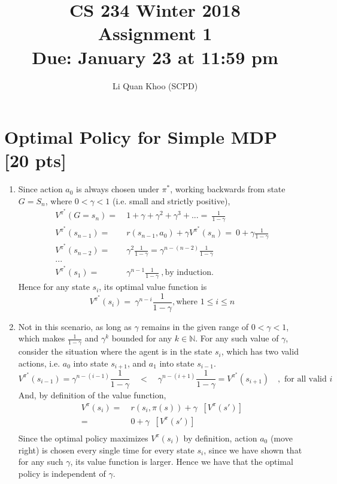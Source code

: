 \documentclass[11pt]{article}
\title{CS 234 Winter 2018 \\ Assignment 1 \\ Due: January 23 at 11:59 pm}
\author{ Li Quan Khoo (SCPD) }
\date{}
\newcommand{\Ex}{\mathbb E}
\newcommand{\Vfunc}[2]{\ensuremath{V^{#1}(#2)}}
\begin{document}
	\maketitle

\section{Optimal Policy for Simple MDP [20 pts]}

\begin{enumerate}[label=(\alph*)]
	
	\item Since action $a_0$ is always chosen under $\pi^*$, working backwards from state $G=S_n$, where $0 < \gamma < 1$ (i.e. small and strictly positive),
	\begin{align*}
	\Vfunc{\pi^*}{G=s_n}   =&\ 1+\gamma+\gamma^2+\gamma^3+... =\ \frac{1}{1-\gamma} \\ 
	\Vfunc{\pi^*}{s_{n-1}} =&\ r(s_{n-1}, a_0) + \gamma \Vfunc{\pi^*}{s_n} =\ 0 + \gamma \frac{1}{1-\gamma} \\ 
	\Vfunc{\pi^*}{s_{n-2}} =&\ \gamma^2 \frac{1}{1-\gamma} = \gamma^{n-(n-2)} \frac{1}{1-\gamma} \\ 
	... \\ 
	\Vfunc{\pi^*}{s_1}   =&\ \gamma^{n-1} \frac{1}{1-\gamma} \ ,\textrm{by induction.}
	\end{align*}
	Hence for any state $s_i$, its optimal value function is
	$$\Vfunc{\pi^*}{s_i}   =\ \gamma^{n-i} \frac{1}{1-\gamma}, \textrm{where } 1 \leq i \leq n$$

	
	\item Not in this scenario, as long as $\gamma$ remains in the given range of $0 < \gamma < 1$, which makes $\frac{1}{1-\gamma}$ and $\gamma^k$ bounded for any $k\in\mathbb{N}$. For any such value of $\gamma$, consider the situation where the agent is in the state $s_i$, which has two valid actions, i.e. $a_0$ into state $s_{i+1}$, and $a_1$ into state $s_{i-1}$.
	$$ \Vfunc{\pi^*}{s_{i-1}} = \gamma^{n-(i-1)}\frac{1}{1-\gamma} \quad <
	\quad \gamma^{n-(i+1)}\frac{1}{1-\gamma} = \Vfunc{\pi^*}{s_{i+1}} \quad , \textrm{ for all valid } i$$
	And, by definition of the value function,
	\begin{align*}
	\Vfunc{\pi}{s_i} =& \ r(s_i, \pi(s)) + \gamma \mathop{\Ex_{p(s'|s,a)\sim\pi}}[\Vfunc{\pi}{s'}] \\ 
	               =& \ 0 + \gamma \mathop{\Ex_\pi}[\Vfunc{\pi}{s'}] \\ 
	\end{align*}
	Since the optimal policy maximizes $V^{\pi}(s_i)$ by definition, action $a_0$ (move right) is chosen every single time for every state $s_i$, since we have shown that for any such $\gamma$, its value function is larger. Hence we have that the optimal policy is independent of $\gamma$.
	

\end{enumerate}
\end{document}
